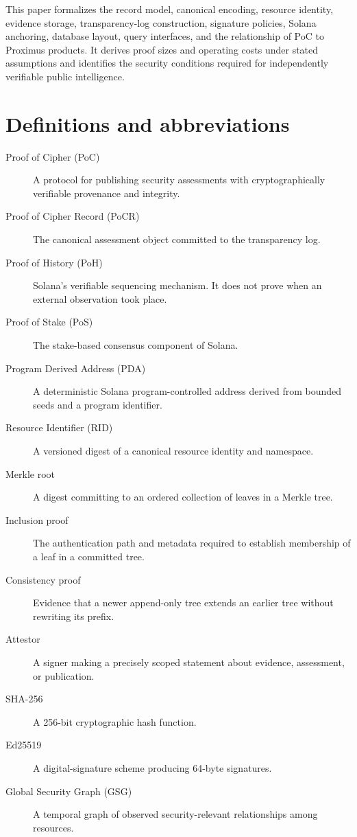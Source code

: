 \documentclass[10pt,a4paper]{article}
\begin{document}
This paper formalizes the record model, canonical encoding, resource identity, evidence storage, transparency-log construction, signature policies, Solana anchoring, database layout, query interfaces, and the relationship of PoC to Proximus products. It derives proof sizes and operating costs under stated assumptions and identifies the security conditions required for independently verifiable public intelligence.


\section*{Definitions and abbreviations}
\begin{description}
\item[Proof of Cipher (PoC)] A protocol for publishing security assessments with cryptographically verifiable provenance and integrity.
\item[Proof of Cipher Record (PoCR)] The canonical assessment object committed to the transparency log.
\item[Proof of History (PoH)] Solana's verifiable sequencing mechanism. It does not prove when an external observation took place.
\item[Proof of Stake (PoS)] The stake-based consensus component of Solana.
\item[Program Derived Address (PDA)] A deterministic Solana program-controlled address derived from bounded seeds and a program identifier.
\item[Resource Identifier (RID)] A versioned digest of a canonical resource identity and namespace.
\item[Merkle root] A digest committing to an ordered collection of leaves in a Merkle tree.
\item[Inclusion proof] The authentication path and metadata required to establish membership of a leaf in a committed tree.
\item[Consistency proof] Evidence that a newer append-only tree extends an earlier tree without rewriting its prefix.
\item[Attestor] A signer making a precisely scoped statement about evidence, assessment, or publication.
\item[SHA-256] A 256-bit cryptographic hash function.
\item[Ed25519] A digital-signature scheme producing 64-byte signatures.
\item[Global Security Graph (GSG)] A temporal graph of observed security-relevant relationships among resources.

\end{description}
\end{document}
